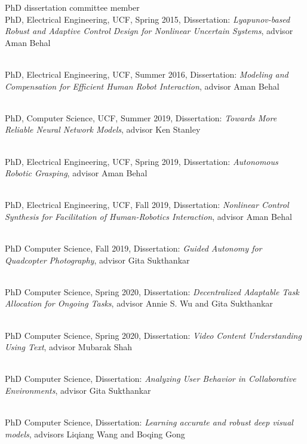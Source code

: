 \begin{category}{PhD dissertation committee member}
\\
PhD, Electrical Engineering, UCF, Spring 2015, Dissertation: {\em Lyapunov-based Robust and Adaptive Control Design for Nonlinear Uncertain Systems}, advisor Aman Behal

\\
PhD, Electrical Engineering, UCF, Summer 2016, Dissertation: {\em Modeling and Compensation for Efficient Human Robot Interaction}, advisor Aman Behal

 \\
PhD, Computer Science, UCF, Summer 2019, Dissertation: {\em Towards More Reliable Neural Network Models}, advisor Ken Stanley %

 \\
PhD, Electrical Engineering, UCF, Spring 2019, Dissertation: {\em Autonomous Robotic Grasping},  advisor Aman Behal

 \\
PhD, Electrical Engineering, UCF, Fall 2019, Dissertation: {\em Nonlinear Control Synthesis for Facilitation of Human-Robotics Interaction},
advisor Aman Behal %

 \\
PhD Computer Science, Fall 2019, Dissertation: {\em Guided Autonomy for Quadcopter Photography}, advisor Gita Sukthankar

 \\
PhD Computer Science, Spring 2020, Dissertation: {\em Decentralized Adaptable Task Allocation for Ongoing Tasks}, advisor Annie S. Wu and Gita Sukthankar

 \\
PhD Computer Science, Spring 2020, Dissertation: {\em Video Content Understanding Using Text}, advisor Mubarak Shah

 \\
PhD Computer Science, Dissertation: {\em Analyzing User Behavior in Collaborative Environments}, advisor Gita Sukthankar


 \\
PhD Computer Science, Dissertation: {\em Learning accurate and robust deep visual models}, advisors Liqiang Wang and Boqing Gong


\end{category}
